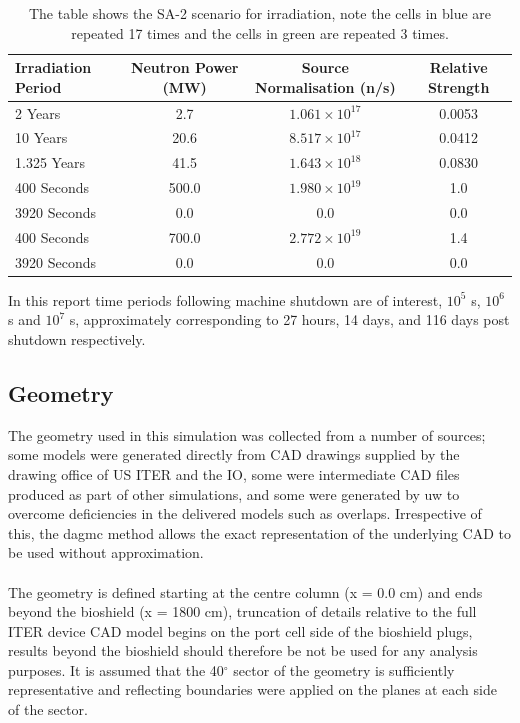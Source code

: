\documentclass[12pt]{article}
\begin{document}
\begin{table}[ht!]
   \begin{tabular}{| l | c | c | c |}
      \hline 
      Irradiation Period & Neutron Power (MW) & Source Normalisation (n/s) &  Relative Strength \\
      \hline
      2 Years & 2.7 & $1.061\times10^{17}$ & 0.0053 \\
      10 Years & 20.6 & $8.517\times10^{17}$ & 0.0412 \\
      1.325 Years & 41.5 & $1.643\times10^{18}$ & 0.0830 \\
      \cellcolor{blue!25} \cellcolor{blue!25} 400 Seconds & \cellcolor{blue!25} 500.0 & \cellcolor{blue!25} $1.980\times10^{19}$ & \cellcolor{blue!25} 1.0  \\
      \cellcolor{blue!25} 3920 Seconds & \cellcolor{blue!25} 0.0 & \cellcolor{blue!25} 0.0 & \cellcolor{blue!25} 0.0 \\
      \cellcolor{green!25} 400 Seconds & \cellcolor{green!25} 700.0 & \cellcolor{green!25} $2.772\times10^{19}$ &\cellcolor{green!25} 1.4 \\
      \cellcolor{green!25} 3920 Seconds & \cellcolor{green!25} 0.0 & \cellcolor{green!25} 0.0 &\cellcolor{green!25} 0.0 \\
      \hline
\end{tabular}
\caption{The table shows the SA-2 scenario for irradiation, note the
         cells in \textcolor{blue!25}{blue} are repeated 17 times
         and the cells in \textcolor{green!25}{green} are repeated 3
         times.}
\label{tab:irrad_scenario}
\end{table}
In this report time periods following machine shutdown are of interest,
$10^5$ s, $10^6$ s and $10^7$ s, approximately corresponding to 27 
hours, 14 days, and 116 days post shutdown respectively.

\subsection{Geometry}
The geometry used in this simulation was collected from a number of sources;
some models were generated directly from CAD drawings supplied by the
drawing office of US ITER and the IO, some were intermediate CAD files produced
as part of other simulations, and some were generated by \gls{uw} to overcome 
deficiencies in the delivered models such as overlaps. Irrespective of this, the \gls{dagmc} method
allows the exact representation of the underlying CAD to be used without
approximation.
\\
\\
The geometry is defined starting at the centre column (x = 0.0 cm) and ends
beyond the bioshield (x = 1800 cm), truncation of details relative to the full
ITER device CAD model begins on the port cell side of the bioshield plugs,
results beyond the bioshield should therefore be not be used for any
analysis purposes.  It is assumed that the 40$^{\circ}$ sector of the geometry
is sufficiently representative and reflecting boundaries were applied on the
planes at each side of the sector.
\end{document}

